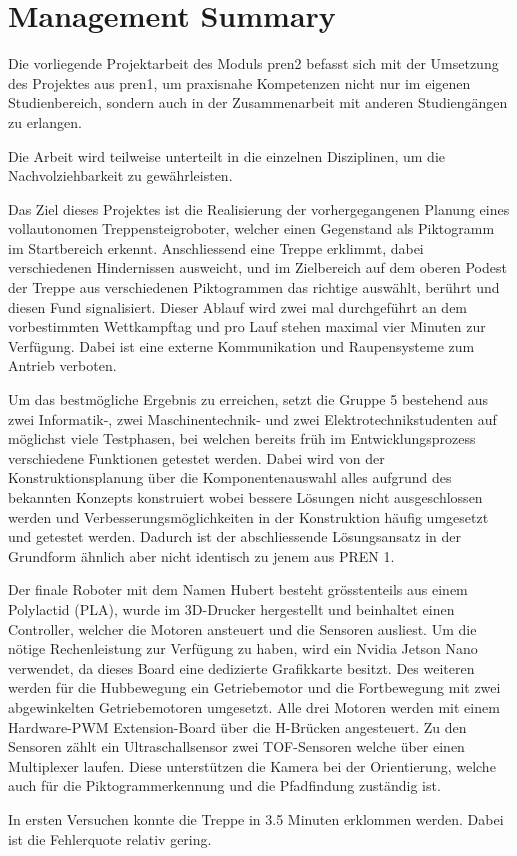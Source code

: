 \newpage
\section*{Management Summary}

Die vorliegende Projektarbeit des Moduls \acrfull{pren2} befasst sich mit der Umsetzung des Projektes aus \acrfull{pren1}, um praxisnahe Kompetenzen nicht nur im eigenen Studienbereich, sondern auch in der Zusammenarbeit mit anderen Studiengängen zu erlangen.

Die Arbeit wird teilweise unterteilt in die einzelnen Disziplinen, um die Nachvolziehbarkeit zu gewährleisten.

Das Ziel dieses Projektes ist die Realisierung der vorhergegangenen Planung eines vollautonomen Treppensteigroboter, welcher einen Gegenstand als Piktogramm im Startbereich erkennt. Anschliessend eine Treppe erklimmt, dabei verschiedenen Hindernissen ausweicht,  und im Zielbereich auf dem oberen Podest der Treppe aus verschiedenen Piktogrammen das richtige auswählt, berührt und diesen Fund signalisiert. Dieser Ablauf wird zwei mal durchgeführt an dem vorbestimmten Wettkampftag und pro Lauf stehen maximal vier Minuten zur Verfügung. Dabei ist eine externe Kommunikation und Raupensysteme zum Antrieb verboten.

Um das bestmögliche Ergebnis zu erreichen, setzt die Gruppe 5 bestehend aus zwei Informatik-,  zwei Maschinentechnik- und zwei Elektrotechnikstudenten auf möglichst viele Testphasen, bei welchen bereits früh im Entwicklungsprozess verschiedene Funktionen getestet werden. Dabei wird von der Konstruktionsplanung über die Komponentenauswahl alles aufgrund des bekannten Konzepts konstruiert wobei bessere Lösungen nicht ausgeschlossen werden und Verbesserungsmöglichkeiten in der Konstruktion häufig umgesetzt und getestet werden. Dadurch ist der abschliessende Lösungsansatz in der Grundform ähnlich aber nicht identisch zu jenem aus PREN 1.

Der finale Roboter mit dem Namen \glqq Hubert\grqq{} besteht grösstenteils aus einem Polylactid (PLA), wurde im 3D-Drucker hergestellt und beinhaltet einen Controller, welcher die Motoren ansteuert und die Sensoren ausliest. Um die nötige Rechenleistung zur Verfügung zu haben, wird ein Nvidia Jetson Nano verwendet, da dieses Board eine dedizierte Grafikkarte besitzt. Des weiteren werden für die Hubbewegung ein Getriebemotor und die Fortbewegung mit zwei abgewinkelten Getriebemotoren umgesetzt. Alle drei Motoren werden mit einem Hardware-PWM Extension-Board über die H-Brücken angesteuert. Zu den Sensoren zählt ein Ultraschallsensor zwei TOF-Sensoren welche über einen Multiplexer laufen. Diese unterstützen die Kamera bei der Orientierung, welche auch für die Piktogrammerkennung und die Pfadfindung zuständig ist.

In ersten Versuchen konnte die Treppe in 3.5 Minuten erklommen werden. Dabei ist die Fehlerquote relativ gering.



